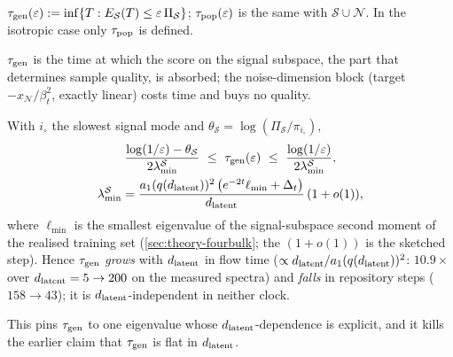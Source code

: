 \begin{definition}\label{def:taugen-main}
$\tau_{\mathrm{gen}}(\varepsilon):=\inf\{T:E_{\mathcal S}(T)\le\varepsilon\,\Pi_{\mathcal S}\}$; $\tau_{\rm pop}(\varepsilon)$ is the same with $\mathcal S\cup\mathcal N$. In the isotropic case only $\tau_{\rm pop}$ is defined.
\end{definition}
$\tau_{\mathrm{gen}}$ is the time at which the score on the signal subspace, the part that determines sample quality, is absorbed; the noise-dimension block (target $-x_{\mathcal N}/\beta_t^2$, exactly linear) costs time and buys no quality.

\begin{proposition}\label{prop:taugen-main}
With $i_\circ$ the slowest signal mode and $\theta_{\mathcal S}=\log(\Pi_{\mathcal S}/\pi_{i_\circ})$,
\begin{gather}
\frac{\log(1/\varepsilon)-\theta_{\mathcal S}}{2\lambda^{\mathcal S}_{\min}}\ \le\ \taugen(\varepsilon)\ \le\ \frac{\log(1/\varepsilon)}{2\lambda^{\mathcal S}_{\min}},\label{eq:taugen-bounds-main}\\
\lambda^{\mathcal S}_{\min}=\frac{a_1(q(\dlat))^2\,\bigl(e^{-2t}\ell_{\min}+\Delta_t\bigr)}{\dlat}\,(1+o(1)),\label{eq:lambdaSmin-main}
\end{gather}
where $\ell_{\min}$ is the smallest eigenvalue of the signal-subspace second moment of the realised training set (\cref{sec:theory-fourbulk}; the $(1+o(1))$ is the sketched step). Hence $\tau_{\mathrm{gen}}$ \emph{grows} with $d_{\mathrm{latent}}$ in flow time ($\propto d_{\mathrm{latent}}/a_1(q(d_{\mathrm{latent}}))^2$: $10.9\times$ over $d_{\mathrm{latent}}=5\to200$ on the measured spectra) and \emph{falls} in repository steps ($158\to43$); it is $d_{\mathrm{latent}}$-independent in neither clock.
\end{proposition}
This pins $\tau_{\mathrm{gen}}$ to one eigenvalue whose $d_{\mathrm{latent}}$-dependence is explicit, and it kills the earlier claim that $\tau_{\mathrm{gen}}$ is flat in $d_{\mathrm{latent}}$.

